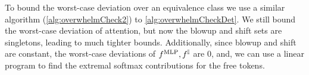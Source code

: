 To bound the worst-case deviation over an equivalence class we use a similar algorithm (\cref{alg:overwhelmCheck2}) to \cref{alg:overwhelmCheckDet}.
We still bound the worst-case deviation of attention, but now the blowup and shift sets are singletons, leading to much tighter bounds.
Additionally, since blowup and shift are constant, the worst-case deviations of $f^{\text{MLP}}, f^{\mathbb{I}}$ are $0$, and, we can use a linear program to find the extremal softmax contributions for the free tokens.


